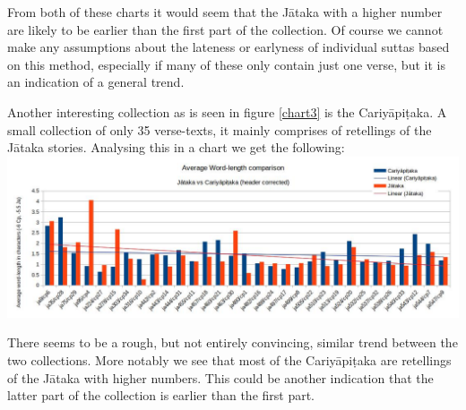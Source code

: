 From both of these charts it would seem that the Jātaka with a higher number are likely to be earlier than the first part of the collection. Of course we cannot make any assumptions about the lateness or earlyness of individual suttas based on this method, especially if many of these only contain just one verse, but it is an indication of a general trend.

Another interesting collection as is seen in figure \ref{chart3} is the Cariyāpiṭaka. A small collection of only 35 verse-texts, it mainly comprises of retellings of the Jātaka stories. Analysing this in a chart we get the following:\\

\includegraphics[width=\linewidth]{jacp.jpg}
\label{jacp}

\medskip
There seems to be a rough, but not entirely convincing, similar trend between the two collections. More notably we see that most of the Cariyāpiṭaka are retellings of the Jātaka with higher numbers. This could be another indication that the latter part of the collection is earlier than the first part.
